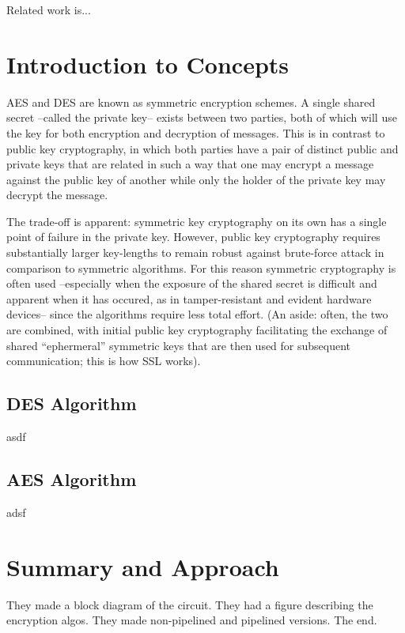 \documentclass[journal,twocolumn]{IEEEtran}
\begin{document}
Related work is...

\section{Introduction to Concepts}

 AES and DES are known as symmetric encryption schemes. A
single shared secret --called the private key-- exists between two parties,
both of which will use the key for both encryption and decryption of messages.
This is in contrast to public key cryptography, in which both parties have a
pair of distinct public and private keys that are related in such a way that
one may encrypt a message against the public key of another while only the
holder of the private key may decrypt the message.

The trade-off is apparent: symmetric key cryptography on its own has a single 
point of failure in the private key. However, public key cryptography 
requires substantially larger key-lengths to remain robust against brute-force 
attack in comparison to symmetric algorithms. For this reason symmetric 
cryptography is often used --especially when the exposure of the shared secret
is difficult and apparent when it has occured, as in tamper-resistant and
evident hardware devices-- since the algorithms require less total effort. 
(An aside: often, the two are combined, with initial public key cryptography 
facilitating the exchange of shared ``ephermeral'' symmetric keys that are 
then used for subsequent communication; this is how SSL works).

\subsection{DES Algorithm}

asdf

\subsection{AES Algorithm}

adsf

\section{Summary and Approach}

They made a block diagram of the circuit. They had a figure describing the 
encryption algos. They made non-pipelined and pipelined versions. The end.
\end{document}
